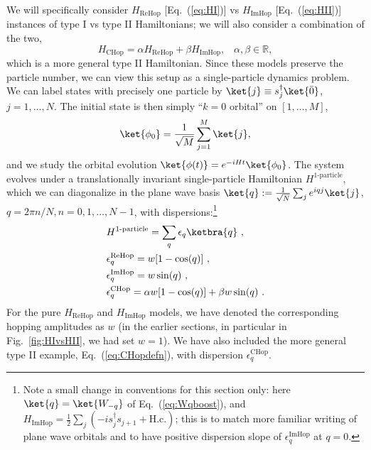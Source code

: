 \documentclass[prx,letterpaper,aps,superscriptaddress,floatfix,twocolumn,nofootinbib]{revtex4-2}
\theoremstyle{definition}
\newcommand{\defn}{:=}
\begin{document}
%
We will specifically consider $H_{\text{ReHop}}$ [Eq.~(\ref{eq:HI})] vs $H_{\text{ImHop}}$ [Eq.~(\ref{eq:HII})] instances of type I vs type II Hamiltonians; we will also consider a combination of the two, 
\begin{equation}
H_{\text{CHop}} = \alpha H_{\text{ReHop}} + \beta H_{\text{ImHop}},\;\;\;\alpha,\beta\in\mathbb{R},
\label{eq:CHopdefn}
\end{equation}
which is a more general type II Hamiltonian.
%
Since these models preserve the particle number, we can view this setup as a single-particle dynamics problem.
%
We can label states with precisely one particle by $\ket{j} \equiv s_j^\dagger \ket{\bar{0}}$, $j = 1, \dots, N$.
%
The initial state is then simply ``$k = 0$ orbital'' on $[1, \dots, M]$,
\begin{equation}
\ket{\phi_0} = \frac{1}{\sqrt{M}} \sum_{j=1}^M \ket{j},
\end{equation}
and we study the orbital evolution $\ket{\phi(t)} = e^{-iHt} \ket{\phi_0}$.
%
The system evolves under a translationally invariant single-particle Hamiltonian $H^{\text{1-particle}}$, which we can diagonalize in the plane wave basis $\ket{q} \defn \frac{1}{\sqrt{N}} \sum_j e^{i q j} \ket{j}$, $q = 2\pi n/N, n=0, 1, \dots, N-1$, with dispersions:\footnote{
Note a small change in conventions for this section only: here $\ket{q} = \ket{W_{-q}}$ of Eq.~(\ref{eq:Wqboost}), and $H_{\text{ImHop}} = \frac{1}{2} \sum_j (-i s_j^\dagger s_{j+1} + \text{H.c.})$; this is to match more familiar writing of plane wave orbitals and to have positive dispersion slope of $\epsilon_q^{\text{ImHop}}$ at $q = 0$.
}
%
\begin{align}
& H^{\text{1-particle}} = \sum_q \epsilon_q \ketbra{q} ~, \\
& \epsilon_q^{\text{ReHop}} = w [1 - \cos(q)] ~, \label{eq:epsReHop} \\
& \epsilon_q^{\text{ImHop}} = w \sin(q) ~, \label{eq:epsImHop} \\
& \epsilon_q^{\text{CHop}} = \alpha w [1 - \cos(q)] + \beta w \sin(q) ~. \label{eq:epsCHop}
\end{align}
%
For the pure $H_{\text{ReHop}}$ and $H_{\text{ImHop}}$ models, we have denoted the corresponding hopping amplitudes as $w$ (in the earlier sections, in particular in Fig.~\ref{fig:HIvsHII}, we had set $w = 1$).
%
We have also included the more general type II example, Eq.~(\ref{eq:CHopdefn}), with dispersion $\epsilon^{\text{CHop}}_q$.
%
\end{document}
